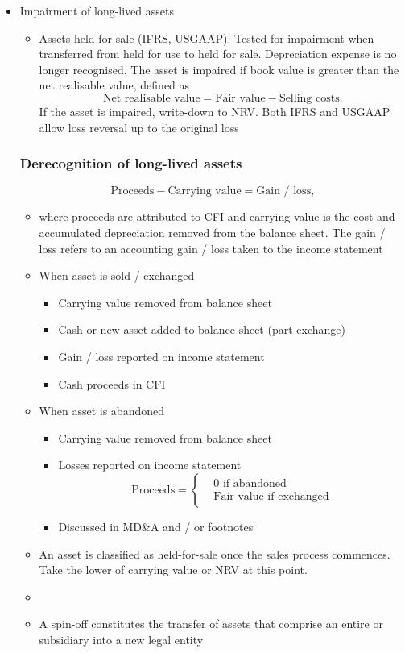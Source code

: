 \documentclass[../notes_compiled.tex]{subfiles}
\begin{document}
\begin{itemize}
\item Impairment of long-lived assets
\begin{itemize}
\item Assets held for sale (IFRS, USGAAP): Tested for impairment when transferred from held for use to held for sale. Depreciation expense is no longer recognised. The asset is impaired if book value is greater than the net realisable value, defined as
\begin{equation}
\text{Net realisable value} = \text{Fair value} - \text{Selling costs}.
\end{equation}
If the asset is impaired, write-down to NRV. Both IFRS and USGAAP allow loss reversal up to the original loss
\end{itemize}


\subsubsection{Derecognition of long-lived assets}
\begin{equation*}
\text{Proceeds} - \text{Carrying value} = \text{Gain / loss},
\end{equation*}
\begin{itemize}
\item[] where proceeds are attributed to CFI and carrying value is the cost and accumulated depreciation removed from the balance sheet. The gain / loss refers to an accounting gain / loss taken to the income statement
\item When asset is sold / exchanged
\begin{itemize}
\item Carrying value removed from balance sheet
\item Cash or new asset added to balance sheet (part-exchange)
\item Gain / loss reported on income statement
\item Cash proceeds in CFI
\end{itemize}
\item When asset is abandoned
\begin{itemize}
\item Carrying value removed from balance sheet
\item Losses reported on income statement
\begin{equation*}
\text{Proceeds}=\begin{cases}&\text{0 if abandoned} \\ &\text{Fair value if exchanged} \end{cases}
\end{equation*}
\item Discussed in MD\&A and / or footnotes
\end{itemize}
\item An asset is classified as held-for-sale once the sales process commences. Take the lower of carrying value or NRV at this point.
\item[]
\item A spin-off constitutes the transfer of assets that comprise an entire or subsidiary into a new legal entity
\end{itemize}


\end{itemize}
\end{document}
